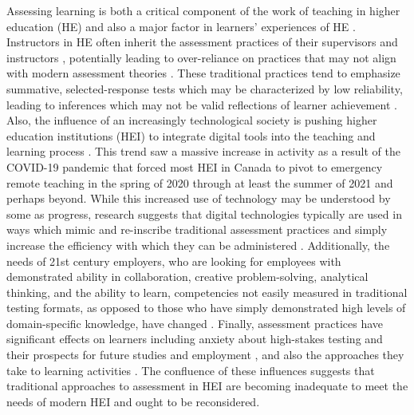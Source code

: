 \documentclass[
]{book}
\begin{document}
Assessing learning is both a critical component of the work of teaching in higher education (HE) and also a major factor in learners' experiences of HE \citep{biggsWhatStudentDoes1999, birenbaumAssessmentInstructionPreferences2007, woldeab21stCenturyAssessment2019}. Instructors in HE often inherit the assessment practices of their supervisors and instructors \citep{lipnevichWhatGradesMean2020}, potentially leading to over-reliance on practices that may not align with modern assessment theories \citep{boudChallengesReformingHigher2020, masseyAssessmentLiteracyCollege2020, shepardRoleAssessmentLearning2000}. These traditional practices tend to emphasize summative, selected-response tests \citep{floresPerceptionsEffectivenessFairness2015, harlenSystematicReviewImpact2002, lipnevichWhatGradesMean2020} which may be characterized by low reliability, leading to inferences which may not be valid reflections of learner achievement \citep{knightSummativeAssessmentHigher2002, smithglasgowStandardizedTestingNursing2019}. Also, the influence of an increasingly technological society is pushing higher education institutions (HEI) to integrate digital tools into the teaching and learning process \citep{pellegrinoPerspectivesIntegrationTechnology2010}. This trend saw a massive increase in activity as a result of the COVID-19 pandemic that forced most HEI in Canada to pivot to emergency remote teaching in the spring of 2020 through at least the summer of 2021 and perhaps beyond. While this increased use of technology may be understood by some as progress, research suggests that digital technologies typically are used in ways which mimic and re-inscribe traditional assessment practices and simply increase the efficiency with which they can be administered \citep{broadfootAssessmentTwentyFirstCenturyLearning2016}. Additionally, the needs of 21st century employers, who are looking for employees with demonstrated ability in collaboration, creative problem-solving, analytical thinking, and the ability to learn, competencies not easily measured in traditional testing formats, as opposed to those who have simply demonstrated high levels of domain-specific knowledge, have changed \citep{worldeconomicforumFutureJobsReport2020}. Finally, assessment practices have significant effects on learners including anxiety about high-stakes testing and their prospects for future studies and employment \citep{harlenSystematicReviewImpact2002}, and also the approaches they take to learning activities \citep{biggsTeachingQualityLearning2011, delucaDifferentialSituatedView2019}. The confluence of these influences suggests that traditional approaches to assessment in HEI are becoming inadequate to meet the needs of modern HEI and ought to be reconsidered.
\end{document}
